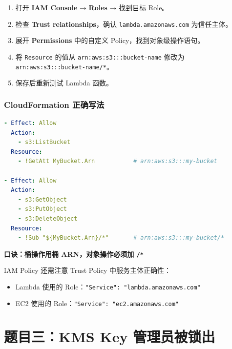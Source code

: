\documentclass[12pt, a4paper]{article}
\begin{document}
\begin{solution}
\begin{enumerate}
    \item 打开 \textbf{IAM Console} → \textbf{Roles} → 找到目标 Role。
    \item 检查 \textbf{Trust relationships}，确认 \texttt{lambda.amazonaws.com} 为信任主体。
    \item 展开 \textbf{Permissions} 中的自定义 Policy，找到对象级操作语句。
    \item 将 \texttt{Resource} 的值从 \texttt{arn:aws:s3:::bucket-name} 修改为 \texttt{arn:aws:s3:::bucket-name/*}。
    \item 保存后重新测试 Lambda 函数。
\end{enumerate}
\end{solution}

\subsubsection{CloudFormation 正确写法}

\begin{lstlisting}[language=yaml, caption=CloudFormation IAM Policy 正确示例]
- Effect: Allow
  Action:
    - s3:ListBucket
  Resource:
    - !GetAtt MyBucket.Arn           # arn:aws:s3:::my-bucket

- Effect: Allow
  Action:
    - s3:GetObject
    - s3:PutObject
    - s3:DeleteObject
  Resource:
    - !Sub "${MyBucket.Arn}/*"       # arn:aws:s3:::my-bucket/*
\end{lstlisting}

\begin{keypoint}
\textbf{口诀：桶操作用桶 ARN，对象操作必须加 \texttt{/*}}

IAM Policy 还需注意 Trust Policy 中服务主体正确性：
\begin{itemize}
    \item Lambda 使用的 Role：\texttt{"Service": "lambda.amazonaws.com"}
    \item EC2 使用的 Role：\texttt{"Service": "ec2.amazonaws.com"}
\end{itemize}
\end{keypoint}

\newpage
\section{题目三：KMS Key 管理员被锁出}
\end{document}
